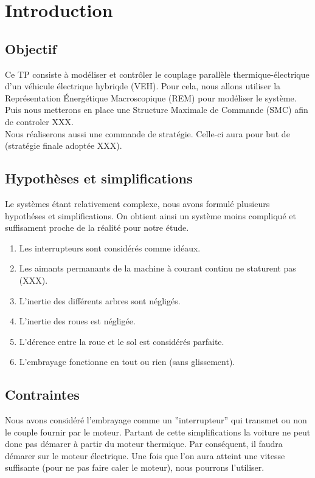\section{Introduction}

\subsection{Objectif}

	Ce TP consiste à modéliser et contrôler le couplage parallèle thermique-électrique d'un véhicule électrique hybriqde (VEH). Pour cela, nous allons utiliser la Représentation Énergétique Macroscopique (REM) pour modéliser le système. Puis nous metterons en place une Structure Maximale de Commande (SMC) afin de controler XXX.\\
	Nous réaliserons aussi une commande de stratégie. Celle-ci aura pour but de (stratégie finale adoptée XXX).

\subsection{Hypothèses et simplifications}

	Le systèmes étant relativement complexe, nous avons formulé plusieurs hypothéses et simplifications. On obtient ainsi un système moins compliqué et suffisament proche de la réalité pour notre étude. 

\begin{enumerate} 
\item Les interrupteurs sont considérés comme idéaux.
\item Les aimants permanants de la machine à courant continu ne staturent pas (XXX).
\item L'inertie des différents arbres sont négligés.
\item L'inertie des roues est négligée.
\item L'dérence entre la roue et le sol est considérés parfaite. 
\item L'embrayage fonctionne en tout ou rien (sans glissement).
\end{enumerate}

\subsection{Contraintes}

	Nous avons considéré l'embrayage comme un ''interrupteur'' qui transmet ou non le couple fournir par le moteur. Partant de cette simplifications la voiture ne peut donc pas démarer à partir du moteur thermique. Par conséquent, il faudra démarer sur le moteur électrique. Une fois que l'on aura atteint une vitesse suffisante (pour ne pas faire caler le moteur), nous pourrons l'utiliser.

